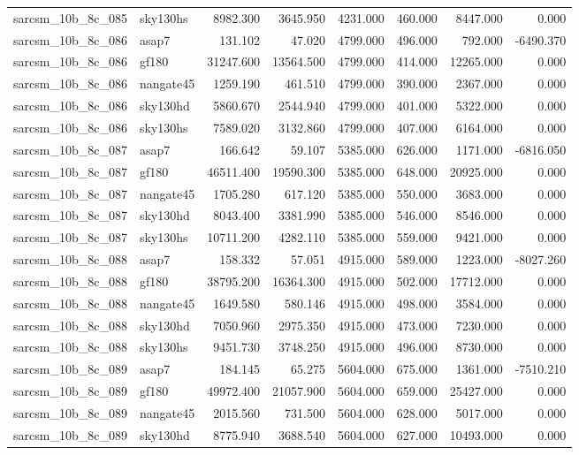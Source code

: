 \begin{tabular}{llrrrrrr}
sarcsm\_10b\_8c\_085 & sky130hs & 8982.300 & 3645.950 & 4231.000 & 460.000 & 8447.000 & 0.000 \\
sarcsm\_10b\_8c\_086 & asap7 & 131.102 & 47.020 & 4799.000 & 496.000 & 792.000 & -6490.370 \\
sarcsm\_10b\_8c\_086 & gf180 & 31247.600 & 13564.500 & 4799.000 & 414.000 & 12265.000 & 0.000 \\
sarcsm\_10b\_8c\_086 & nangate45 & 1259.190 & 461.510 & 4799.000 & 390.000 & 2367.000 & 0.000 \\
sarcsm\_10b\_8c\_086 & sky130hd & 5860.670 & 2544.940 & 4799.000 & 401.000 & 5322.000 & 0.000 \\
sarcsm\_10b\_8c\_086 & sky130hs & 7589.020 & 3132.860 & 4799.000 & 407.000 & 6164.000 & 0.000 \\
sarcsm\_10b\_8c\_087 & asap7 & 166.642 & 59.107 & 5385.000 & 626.000 & 1171.000 & -6816.050 \\
sarcsm\_10b\_8c\_087 & gf180 & 46511.400 & 19590.300 & 5385.000 & 648.000 & 20925.000 & 0.000 \\
sarcsm\_10b\_8c\_087 & nangate45 & 1705.280 & 617.120 & 5385.000 & 550.000 & 3683.000 & 0.000 \\
sarcsm\_10b\_8c\_087 & sky130hd & 8043.400 & 3381.990 & 5385.000 & 546.000 & 8546.000 & 0.000 \\
sarcsm\_10b\_8c\_087 & sky130hs & 10711.200 & 4282.110 & 5385.000 & 559.000 & 9421.000 & 0.000 \\
sarcsm\_10b\_8c\_088 & asap7 & 158.332 & 57.051 & 4915.000 & 589.000 & 1223.000 & -8027.260 \\
sarcsm\_10b\_8c\_088 & gf180 & 38795.200 & 16364.300 & 4915.000 & 502.000 & 17712.000 & 0.000 \\
sarcsm\_10b\_8c\_088 & nangate45 & 1649.580 & 580.146 & 4915.000 & 498.000 & 3584.000 & 0.000 \\
sarcsm\_10b\_8c\_088 & sky130hd & 7050.960 & 2975.350 & 4915.000 & 473.000 & 7230.000 & 0.000 \\
sarcsm\_10b\_8c\_088 & sky130hs & 9451.730 & 3748.250 & 4915.000 & 496.000 & 8730.000 & 0.000 \\
sarcsm\_10b\_8c\_089 & asap7 & 184.145 & 65.275 & 5604.000 & 675.000 & 1361.000 & -7510.210 \\
sarcsm\_10b\_8c\_089 & gf180 & 49972.400 & 21057.900 & 5604.000 & 659.000 & 25427.000 & 0.000 \\
sarcsm\_10b\_8c\_089 & nangate45 & 2015.560 & 731.500 & 5604.000 & 628.000 & 5017.000 & 0.000 \\
sarcsm\_10b\_8c\_089 & sky130hd & 8775.940 & 3688.540 & 5604.000 & 627.000 & 10493.000 & 0.000 \\

\end{tabular}
